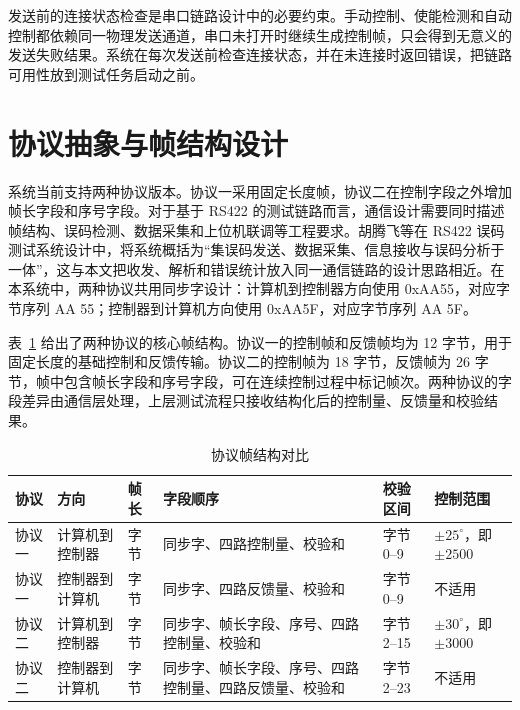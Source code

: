 发送前的连接状态检查是串口链路设计中的必要约束。手动控制、使能检测和自动控制都依赖同一物理发送通道，串口未打开时继续生成控制帧，只会得到无意义的发送失败结果。系统在每次发送前检查连接状态，并在未连接时返回错误，把链路可用性放到测试任务启动之前。

\section{协议抽象与帧结构设计}

系统当前支持两种协议版本。协议一采用固定长度帧，协议二在控制字段之外增加帧长字段和序号字段。对于基于 RS422 的测试链路而言，通信设计需要同时描述帧结构、误码检测、数据采集和上位机联调等工程要求。胡腾飞等在 RS422 误码测试系统设计中，将系统概括为``集误码发送、数据采集、信息接收与误码分析于一体''\cite{hu2026rs422ber}，这与本文把收发、解析和错误统计放入同一通信链路的设计思路相近。在本系统中，两种协议共用同步字设计：计算机到控制器方向使用 0xAA55，对应字节序列 AA 55；控制器到计算机方向使用 0xAA5F，对应字节序列 AA 5F。

表~\ref{tab:protocol-frame-structure} 给出了两种协议的核心帧结构。协议一的控制帧和反馈帧均为 12 字节，用于固定长度的基础控制和反馈传输。协议二的控制帧为 18 字节，反馈帧为 26 字节，帧中包含帧长字段和序号字段，可在连续控制过程中标记帧次。两种协议的字段差异由通信层处理，上层测试流程只接收结构化后的控制量、反馈量和校验结果。

\begin{table}[htb]
  \centering
  \caption{协议帧结构对比}
  \label{tab:protocol-frame-structure}
  \begingroup
  \setlength{\tabcolsep}{2pt}
  \footnotesize
  \begin{tabular}{@{}>{\raggedright\arraybackslash}p{}>{\raggedright\arraybackslash}p{}>{\raggedright\arraybackslash}p{}>{\raggedright\arraybackslash}p{}>{\raggedright\arraybackslash}p{}>{\raggedright\arraybackslash}p{}@{}}
    \toprule
    协议 & 方向 & 帧长 & 字段顺序 & 校验区间 & 控制范围 \\
    \midrule
    协议一 & 计算机到控制器 & 12 字节 & 同步字、四路控制量、校验和 & 字节 0--9 & $\pm25^\circ$，即 $\pm2500$ \\
    协议一 & 控制器到计算机 & 12 字节 & 同步字、四路反馈量、校验和 & 字节 0--9 & 不适用 \\
    协议二 & 计算机到控制器 & 18 字节 & 同步字、帧长字段、序号、四路控制量、校验和 & 字节 2--15 & $\pm30^\circ$，即 $\pm3000$ \\
    协议二 & 控制器到计算机 & 26 字节 & 同步字、帧长字段、序号、四路控制量、四路反馈量、校验和 & 字节 2--23 & 不适用 \\
    \bottomrule
  \end{tabular}
  \endgroup
\end{table}

